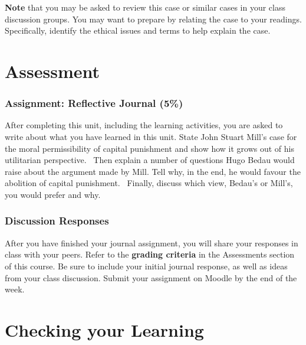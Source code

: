 \documentclass[
]{book}
\begin{document}
\begin{caution}
\textbf{Note} that you may be asked to review this case or similar cases in your class discussion groups. You may want to prepare by relating the case to your readings. Specifically, identify the ethical issues and terms to help explain the case.
\end{caution}

\hypertarget{assessment-7}{%
\section*{Assessment}\label{assessment-7}}

\begin{assessment}
\hypertarget{assignment-reflective-journal-5}{%
\subsubsection*{Assignment: Reflective Journal (5\%)}\label{assignment-reflective-journal-5}}

After completing this unit, including the learning activities, you are asked to write about what you have learned in this unit.
State John Stuart Mill's case for the moral permissibility of capital punishment and show how it grows out of his utilitarian perspective. ~Then explain a number of questions Hugo Bedau would raise about the argument made by Mill. Tell why, in the end, he would favour the abolition of capital punishment. ~Finally, discuss which view, Bedau's or Mill's, you would prefer and why.

\hypertarget{discussion-responses-3}{%
\subsubsection*{Discussion Responses}\label{discussion-responses-3}}

After you have finished your journal assignment, you will share your responses in class with your peers. Refer to the \textbf{grading criteria} in the Assessments section of this course. Be sure to include your initial journal response, as well as ideas from your class discussion. Submit your assignment on Moodle by the end of the week.
\end{assessment}

\hypertarget{checking-your-learning-7}{%
\section*{Checking your Learning}\label{checking-your-learning-7}}
\end{document}
